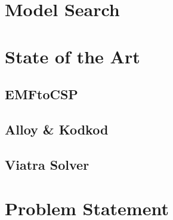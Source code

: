\section{Model Search}




\section{State of the Art}
\subsection{\atlc}


\subsection{EMFtoCSP}


\subsection{Alloy \& Kodkod}


\subsection{Viatra Solver}



% 


\section{Problem Statement}

